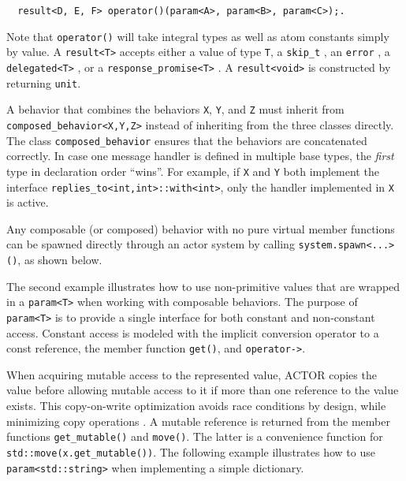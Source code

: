 \begin{lstlisting}
  result<D, E, F> operator()(param<A>, param<B>, param<C>);.
\end{lstlisting}

Note that \lstinline^operator()^ will take integral types as well as atom
constants simply by value. A \lstinline^result<T>^ accepts either a value of
type \lstinline^T^, a \lstinline^skip_t^ , an
\lstinline^error^ , a \lstinline^delegated<T>^ , or a
\lstinline^response_promise<T>^ . A \lstinline^result<void>^ is
constructed by returning \lstinline^unit^.

A behavior that combines the behaviors \lstinline^X^, \lstinline^Y^, and
\lstinline^Z^ must inherit from \lstinline^composed_behavior<X,Y,Z>^ instead of
inheriting from the three classes directly. The class
\lstinline^composed_behavior^ ensures that the behaviors are concatenated
correctly. In case one message handler is defined in multiple base types, the
\emph{first} type in declaration order ``wins''. For example, if \lstinline^X^
and \lstinline^Y^ both implement the interface
\lstinline^replies_to<int,int>::with<int>^, only the handler implemented in
\lstinline^X^ is active.

Any composable (or composed) behavior with no pure virtual member functions can
be spawned directly through an actor system by calling
\lstinline^system.spawn<...>()^, as shown below.


\clearpage

The second example illustrates how to use non-primitive values that are wrapped
in a \lstinline^param<T>^ when working with composable behaviors. The purpose
of \lstinline^param<T>^ is to provide a single interface for both constant and
non-constant access. Constant access is modeled with the implicit conversion
operator to a const reference, the member function \lstinline^get()^, and
\lstinline^operator->^.

When acquiring mutable access to the represented value, ACTOR copies the value
before allowing mutable access to it if more than one reference to the value
exists. This copy-on-write optimization avoids race conditions by design, while
minimizing copy operations . A mutable reference is returned
from the member functions \lstinline^get_mutable()^ and \lstinline^move()^. The
latter is a convenience function for \lstinline^std::move(x.get_mutable())^.
The following example illustrates how to use \lstinline^param<std::string>^
when implementing a simple dictionary.

